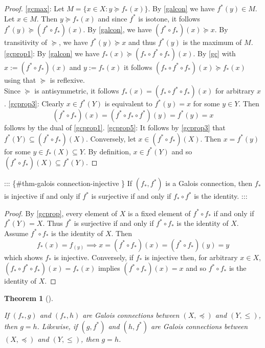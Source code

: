\documentclass[
  letterpaper,
  10pt,
  reqno,
  twopage,
  openany]{book}
\theoremstyle{plain}
\theoremstyle{definition}
\theoremstyle{definition}
\theoremstyle{definition}
\theoremstyle{plain}
\theoremstyle{plain}
\newtheorem{theorem}{Theorem}[chapter]
\theoremstyle{remark}
\begin{document}
\begin{proof}

\eqref{gcmax}: Let \(M=\{x\in X: y\succeq f_*(x)\}\). By \eqref{galcon}
we have \(f^*(y)\in M\). Let \(x\in M\). Then \(y\succeq f_*(x)\) and
since \(f^*\) is isotone, it follows
\(f^*(y)\succeq (f^*\circ f_*)(x)\). By \eqref{galcon}, we have
\((f^*\circ f_*)(x)\succeq x\). By transitivity of \(\succeq\), we have
\(f^*(y)\succeq x\) and thus \(f^*(y)\) is the maximum of \(M\).
\eqref{gcprop1}: By \eqref{galcon} we have
\(f_*(x) \succeq (f_*\circ f^*\circ f_*)(x)\). By \eqref{gc} with
\(x:=(f^*\circ f_*)(x)\) and \(y:=f_*(x)\) it follows
\((f_*\circ f^* \circ f_*)(x)\succeq f_*(x)\) using that \(\succeq\) is
reflexive.\\
Since \(\succeq\) is antisymmetric, it follows
\(f_*(x)=(f_*\circ f^*\circ f_*)(x)\) for arbitrary \(x\).
\eqref{gcprop3}: Clearly \(x\in f^*(Y)\) is equivalent to \(f^*(y)=x\)
for some \(y\in Y\). Then \[
(f^*\circ f_*)(x)=(f^*\circ f_* \circ f^*)(y)=f^*(y)=x
\] follows by the dual of \eqref{gcprop1}. \eqref{gcprop5}: It follows
by \eqref{gcprop3} that \(f^*(Y)\subseteq (f^*\circ f_*)(X)\).
Conversely, let \(x\in (f^*\circ f_*)(X)\). Then \(x=f^*(y)\) for some
\(y\in f_*(X)\subseteq Y\). By definition, \(x\in f^*(Y)\) and so
\((f^*\circ f_*)(X)\subseteq f^*(Y)\).

\end{proof}

::: \{\#thm-galois connection-injective \} If \((f_*, f^*)\) is a Galois
connection, then \(f_*\) is injective if and only if \(f^*\) is
surjective if and only if \(f_*\circ f^*\) is the identity. :::

\begin{proof}

By \ref{gcprop}, every element of \(X\) is a fixed element of
\(f^*\circ f_*\) if and only if \(f^*(Y)=X\). Thus \(f^*\) is surjective
if and only if \(f^*\circ f_*\) is the identity of \(X\). Assume
\(f^*\circ f_*\) is the identity of \(X\). Then \[
f_*(x)=f_(y)\implies x=(f^*\circ f_*)(x)=(f^*\circ f_*)(y)=y
\] which shows \(f_*\) is injective. Conversely, if \(f_*\) is injective
then, for arbitrary \(x\in X\), \((f_*\circ f^*\circ f_*)(x)=f_*(x)\)
implies \((f^*\circ f_*)(x)=x\) and so \(f^*\circ f_*\) is the identity
of \(X\).

\end{proof}

\leavevmode{}%
\begin{theorem}[]\label{thm-galois-connections-unique}

If \((f_*,g)\) and \((f_*, h)\) are Galois connections between
\((X,\preceq)\) and \((Y,\leqslant)\), then \(g=h\). Likewise, if
\((g, f^*)\) and \((h,f^*)\) are Galois connections between
\((X,\preceq)\) and \((Y,\leqslant)\), then \(g=h\).

\end{theorem}
\end{document}
